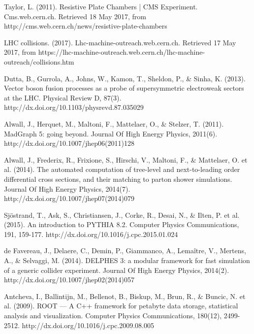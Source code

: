 \documentclass[11pt]{book}
\begin{document}
\begin{thebibliography}{10}
  Taylor, L. (2011). Resistive Plate Chambers | CMS Experiment. Cms.web.cern.ch. Retrieved 18 May 2017, from http://cms.web.cern.ch/news/resistive-plate-chambers

 LHC collisions. (2017). Lhc-machine-outreach.web.cern.ch. Retrieved 17 May 2017, from https://lhc-machine-outreach.web.cern.ch/lhc-machine-outreach/collisions.htm

 Dutta, B., Gurrola, A., Johns, W., Kamon, T., Sheldon, P., \& Sinha, K. (2013). Vector boson fusion processes as a probe of supersymmetric electroweak sectors at the LHC. Physical Review D, 87(3). http://dx.doi.org/10.1103/physrevd.87.035029  

 Alwall, J., Herquet, M., Maltoni, F., Mattelaer, O., \& Stelzer, T. (2011).   MadGraph 5: going beyond. Journal Of High Energy Physics, 2011(6). http://dx.doi.org/10.1007/jhep06(2011)128  

 Alwall, J., Frederix, R., Frixione, S., Hirschi, V., Maltoni, F., \& Mattelaer, O. et al. (2014). The automated computation of tree-level and next-to-leading order differential cross sections, and their matching to parton shower simulations. Journal Of High Energy Physics, 2014(7). http://dx.doi.org/10.1007/jhep07(2014)079  

 Sjöstrand, T., Ask, S., Christiansen, J., Corke, R., Desai, N., \& Ilten, P. et al. (2015). An introduction to PYTHIA 8.2. Computer Physics Communications, 191, 159-177. http://dx.doi.org/10.1016/j.cpc.2015.01.024

 de Favereau, J., Delaere, C., Demin, P., Giammanco, A., Lemaître, V., Mertens, A., \& Selvaggi, M. (2014). DELPHES 3: a modular framework for fast simulation of a generic collider experiment. Journal Of High Energy Physics, 2014(2). http://dx.doi.org/10.1007/jhep02(2014)057  

 Antcheva, I., Ballintijn, M., Bellenot, B., Biskup, M., Brun, R., \& Buncic, N. et al.   (2009). ROOT — A C++ framework for petabyte data storage, statistical analysis and visualization. Computer Physics Communications, 180(12), 2499-2512. http://dx.doi.org/10.1016/j.cpc.2009.08.005   


\end{thebibliography}
\end{document}
